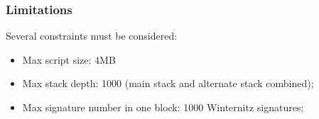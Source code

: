 \subsubsection{Limitations}

Several constraints must be considered:
\begin{itemize}
    \item Max script size: 4MB
    \item Max stack depth: 1000 (main stack and alternate stack combined);
    \item Max signature number in one block: 1000 Winternitz signatures;
\end{itemize}
